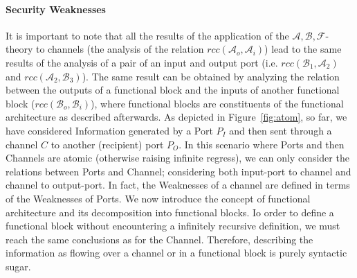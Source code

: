 \documentclass[conference]{IEEEtran}
\newcommand{\assertionRegion}{\mathcal{A}}
\newcommand{\beliefRegion}{\mathcal{B}}
\newcommand{\factRegion}{\mathcal{F}}
\newcommand{\abf}{\assertionRegion,\beliefRegion,\factRegion}
\newcommand{\Rcc}[2]{rcc(#1,#2)}
\begin{document}
\paragraph{Security Weaknesses} 
It is important to note that all the results of the application of the
$\abf$-theory to channels (the analysis of the relation
$\Rcc{\assertionRegion_o}{\assertionRegion_i}$) lead to the same results of the
analysis of a pair of an input and output port (i.e.
$\Rcc{\beliefRegion_1}{\assertionRegion_2}$ and
$\Rcc{\assertionRegion_2}{\beliefRegion_3}$).  The same result can be obtained
by analyzing the relation between the outputs of a functional block and the
inputs of another functional block ($\Rcc{\beliefRegion_o}{\beliefRegion_i}$), 
where functional blocks are constituents of
the functional architecture as described afterwards.  As depicted in
Figure~\ref{fig:atom}, so far, we have considered Information generated by a
Port $P_I$ and then sent through a channel $C$ to another (recipient) port
$P_O$. In this scenario where Ports and then Channels are atomic (otherwise
raising infinite regress), we can only  consider the relations between Ports
and Channel; considering both input-port to channel and channel to output-port.
In fact, the Weaknesses of a channel are defined in terms of the Weaknesses of
Ports. We now introduce the concept of functional architecture and its
decomposition into functional blocks.  Io order to define a functional block
without encountering a infinitely recursive definition, we must reach the same
conclusions as for the Channel. Therefore, describing the information as
flowing over a channel or in a functional block is purely syntactic sugar.
\end{document}
